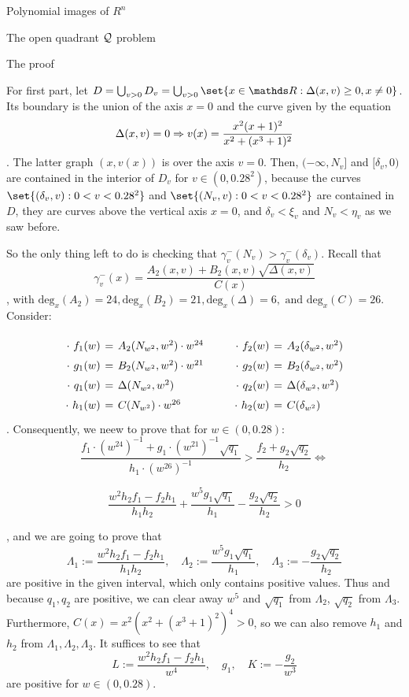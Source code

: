 \documentclass[11pt, a4paper, english, twoside, notitlepage]{report}
\begin{document}
\begin{chapter}{Polynomial images of $R^n$}
\begin{section}{The open quadrant $\mathcal{Q}$ problem}
\begin{subsection}{The proof}
\begin{Proof}
			
			For first part, let $D=\bigcup_{v>0} D_v=\bigcup_{v>0}\set{x\in \R: \Delta(x,v)\geq 0,x\neq 0}$. Its boundary is the union of the axis $x=0$ and the curve given by the equation 
			$$
			\Delta(x, v) = 0 \Rightarrow v(x)=\frac{x^2(x+1)^2}{x^2+(x^3+1)^2}
			$$
			. The latter graph $\left(x, v(x)\right)$ is over the axis $v = 0$. Then, $(-\infty, N_v]$ and $[\delta_v, 0)$ are contained in the interior of $D_v$ for $v\in (0, 0.28^2)$, because the curves $\set{(\delta_v, v): 0 < v < 0.28^2}$ and $\set{(N_v, v): 0 < v < 0.28^2}$ are contained in $D$, they are curves above the vertical axis $x = 0$, and $\delta_v < \xi_v$ and $N_v < \eta_v$ as we saw before. 
			
			So the only thing left to do is checking that $\gamma_v^-(N_v) > \gamma_v^-(\delta_v)$. Recall that 
			$$\gamma_v^-(x)=\dfrac{A_2(x,v)+B_2(x,v)\sqrt{\Delta(x,v)}}{C(x)}$$
			, with $\text{deg}_x(A_2) = 24, \text{deg}_x(B_2) = 21, \text{deg}_x(\Delta) = 6, \text{ and deg}_x(C) = 26$. Consider:
			
			$$
			\arraycolsep=2pt\def\arraystretch{1.5}
			\begin{array}{rclcrcl}
				\cdot\ f_1(w)&=&A_2(N_{w^2},w^2)\cdot w^{24}& \qquad &\cdot\ f_2(w)&=& A_2(\delta_{w^2},w^2)\\
				\cdot\ g_1(w)&=&B_2(N_{w^2},w^2)\cdot w^{21}& \qquad &\cdot\ g_2(w)&=&B_2(\delta_{w^2},w^2)\\
				\cdot\ q_1(w)&=&\Delta(N_{w^2},w^2)& \qquad &\cdot\ q_2(w)&=&\Delta(\delta_{w^2},w^2)\\
				\cdot\ h_1(w)&=&C(N_{w^2})\cdot w^{26}& \qquad &\cdot\ h_2(w)&=&C(\delta_{w^2})
			\end{array}
			$$
			. Consequently, we neew to prove that for $w \in (0, 0.28)$:
			$$
			\frac{f_1 \cdot (w^{24})^{-1} + g_1\cdot (w^{21})^{-1}\sqrt{q_1}}{h_1 \cdot (w^{26})^{-1}}
			> 
			\frac{f_2+g_2\sqrt{q_2}}{h_2} \iff
			$$

			$$
			\frac{w^2h_2f_1-f_2h_1}{h_1h_2}+\frac{w^5g_1\sqrt{q_1}}{h_1}-\frac{g_2\sqrt{q_2}}{h_2}>0
			$$

			, and we are going to prove that 
			$$
			\Lambda_1 := \frac{w^2h_2f_1-f_2h_1}{h_1h_2},\quad\Lambda_2 := \frac{w^5g_1\sqrt{q_1}}{h_1},\quad \Lambda_3 := -\frac{g_2\sqrt{q_2}}{h_2}
			$$
			are positive in the given interval, which only contains positive values. Thus and because $q_1, q_2$ are positive, we can clear away $w^5$ and $\sqrt{q_1}$ from $\Lambda_2$, $\sqrt{q_2}$ from $\Lambda_3$. Furthermore, $C(x) = x^2(x^2+(x^3+1)^2)^4 > 0$, so we can also remove $h_1$ and $h_2$ from $\Lambda_1, \Lambda_2, \Lambda_3$. It suffices to see that
			$$
			L:=\frac{w^2h_2f_1-f_2h_1}{w^4},\quad g_1,\quad K:=-\frac{g_2}{w^3}
			$$ 
			are positive for $w \in (0,0.28)$. 
			

\end{Proof}
\end{subsection}
\end{section}
\end{chapter}
\end{document}
